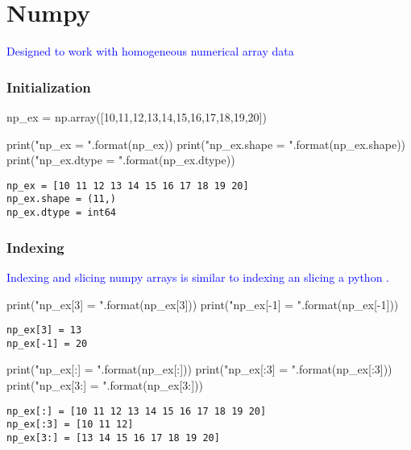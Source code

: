 \section{Numpy}

\textcolor{blue}{Designed to work with homogeneous numerical array data}


\subsubsection{Initialization}

\begin{python}
np_ex = np.array([10,11,12,13,14,15,16,17,18,19,20])
\end{python}



\begin{python}
print("np_ex = {}".format(np_ex))
print("np_ex.shape = {}".format(np_ex.shape))
print("np_ex.dtype = {}".format(np_ex.dtype))
\end{python}
\begin{lstlisting}[style=pyOutStyle]
np_ex = [10 11 12 13 14 15 16 17 18 19 20]
np_ex.shape = (11,)
np_ex.dtype = int64
\end{lstlisting}



\subsubsection{Indexing}

\textcolor{blue}{Indexing and slicing numpy arrays is similar to indexing an slicing a python .}

\begin{python}
print("np_ex[3] = {}".format(np_ex[3]))
print("np_ex[-1] = {}".format(np_ex[-1]))
\end{python}
\begin{lstlisting}[style=pyOutStyle]
np_ex[3] = 13
np_ex[-1] = 20
\end{lstlisting}


\begin{python}
print("np_ex[:] = {}".format(np_ex[:]))
print("np_ex[:3] = {}".format(np_ex[:3]))
print("np_ex[3:] = {}".format(np_ex[3:]))
\end{python}
\begin{lstlisting}[style=pyOutStyle]
np_ex[:] = [10 11 12 13 14 15 16 17 18 19 20]
np_ex[:3] = [10 11 12]
np_ex[3:] = [13 14 15 16 17 18 19 20]
\end{lstlisting}


